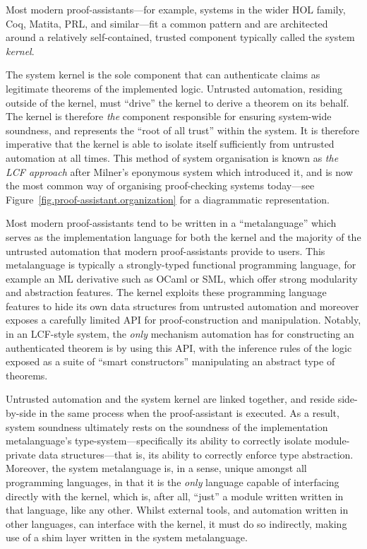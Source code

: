\documentclass[a4paper, UKenglish, cleveref, autoref, thm-restate]{lipics-v2021}
\begin{document}
Most modern proof-assistants---for example, systems in the wider HOL family, Coq, Matita, PRL, and similar---fit a common pattern and are architected around a relatively self-contained, trusted component typically called the system \emph{kernel}.

The system kernel is the sole component that can authenticate claims as legitimate theorems of the implemented logic.
Untrusted automation, residing outside of the kernel, must ``drive'' the kernel to derive a theorem on its behalf.
The kernel is therefore \emph{the} component responsible for ensuring system-wide soundness, and represents the ``root of all trust'' within the system.
It is therefore imperative that the kernel is able to isolate itself sufficiently from untrusted automation at all times.
This method of system organisation is known as \emph{the LCF approach} after Milner's eponymous system which introduced it, and is now the most common way of organising proof-checking systems today---see Figure~\ref{fig.proof-assistant.organization} for a diagrammatic representation.

Most modern proof-assistants tend to be written in a ``metalanguage'' which serves as the implementation language for both the kernel and the majority of the untrusted automation that modern proof-assistants provide to users.
This metalanguage is typically a strongly-typed functional programming language, for example an ML derivative such as OCaml or SML, which offer strong modularity and abstraction features.
The kernel exploits these programming language features to hide its own data structures from untrusted automation and moreover exposes a carefully limited API for proof-construction and manipulation.
Notably, in an LCF-style system, the \emph{only} mechanism automation has for constructing an authenticated theorem is by using this API, with the inference rules of the logic exposed as a suite of ``smart constructors'' manipulating an abstract type of theorems.

Untrusted automation and the system kernel are linked together, and reside side-by-side in the same process when the proof-assistant is executed.
As a result, system soundness ultimately rests on the soundness of the implementation metalanguage's type-system---specifically its ability to correctly isolate module-private data structures---that is, its ability to correctly enforce type abstraction.
Moreover, the system metalanguage is, in a sense, unique amongst all programming languages, in that it is the \emph{only} language capable of interfacing directly with the kernel, which is, after all, ``just'' a module written written in that language, like any other.
Whilst external tools, and automation written in other languages, can interface with the kernel, it must do so indirectly, making use of a shim layer written in the system metalanguage.
\end{document}
